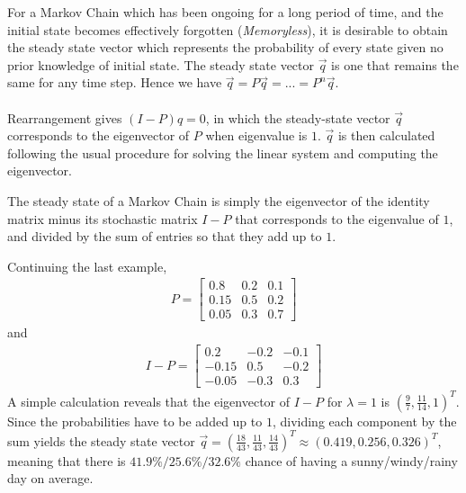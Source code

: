 For a Markov Chain which has been ongoing for a long period of time, and the initial state becomes effectively forgotten (\textit{Memoryless}), it is desirable to obtain the steady state vector which represents the probability of every state given no prior knowledge of initial state. The steady state vector $\vec{q}$ is one that remains the same for any time step. Hence we have $\vec{q} = P\vec{q} = ... = P^n\vec{q}$.\\
\\
Rearrangement gives $(I-P)q = 0$, in which the steady-state vector $\vec{q}$ corresponds to the eigenvector of $P$ when eigenvalue is $1$. $\vec{q}$ is then calculated following the usual procedure for solving the linear system and computing the eigenvector.
\begin{defn}
The steady state of a Markov Chain is simply the eigenvector of the identity matrix minus its stochastic matrix $I - P$ that corresponds to the eigenvalue of $1$, and divided by the sum of entries so that they add up to $1$.
\end{defn}

\begin{exmp}
Continuing the last example, 
\begin{align*}
P = 
\begin{bmatrix}
0.8 & 0.2 & 0.1\\
0.15 & 0.5 & 0.2 \\
0.05 & 0.3 & 0.7
\end{bmatrix}   
\end{align*}
and
\begin{align*}
I - P = 
\begin{bmatrix}
0.2 & -0.2 & -0.1\\
-0.15 & 0.5 & -0.2 \\
-0.05 & -0.3 & 0.3
\end{bmatrix}   
\end{align*}
A simple calculation reveals that the eigenvector of $I - P$ for $\lambda=1$ is $(\frac{9}{7}, \frac{11}{14}, 1)^T$. Since the probabilities have to be added up to $1$, dividing each component by the sum yields the steady state vector $\vec{q} = (\frac{18}{43}, \frac{11}{43}, \frac{14}{43})^T \approx (0.419, 0.256, 0.326)^T$, meaning that there is $41.9\% / 25.6\% / 32.6\%$ chance of having a sunny/windy/rainy day on average.
\end{exmp}

